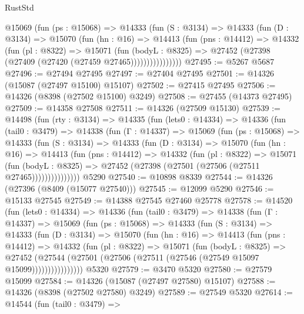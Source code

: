 \begin{lexlean}{RustStd}
\begin{coremodule}
            @15069
              (fun (ps : @15068) =>
              @14333
                (fun (S : @3134) =>
                @14333
                  (fun (D : @3134) =>
                  @15070
                    (fun (hn : @16) =>
                    @14413
                      (fun (pns : @14412) =>
                      @14332
                        (fun (pl : @8322) =>
                        @15071
                          (fun (bodyL : @8325) =>
                          @27452 (@27398 (@27409 (@27420 (@27459 @27465))))))))))))))))
@27495 := @5267 @5687
@27496 := @27494 @27495
@27497 := @27404 @27495
@27501 := @14326 (@15087 (@27497 @15100) @15107)
@27502 := @27415 @27495
@27506 := @14326 (@8398 (@27502 @15100) @3249)
@27508 := @27455 (@14373 @27495)
@27509 := @14358 @27508
@27511 := @14326 (@27509 @15130)
@27539 := @14498
    (fun (rty : @3134) =>
    @14335
      (fun (lets0 : @14334) =>
      @14336
        (fun (tail0 : @3479) =>
        @14338
          (fun (Γ : @14337) =>
          @15069
            (fun (ps : @15068) =>
            @14333
              (fun (S : @3134) =>
              @14333
                (fun (D : @3134) =>
                @15070
                  (fun (hn : @16) =>
                  @14413
                    (fun (pns : @14412) =>
                    @14332
                      (fun (pl : @8322) =>
                      @15071
                        (fun (bodyL : @8325) =>
                        @27452 (@27398 (@27501 (@27506 (@27511 @27465)))))))))))))))
    @5290
@27540 := @10898 @8339
@27544 := @14326 (@27396 (@8409 (@15077 @27540)))
@27545 := @12099 @5290
@27546 := @15133 @27545
@27549 := @14388 @27545 @27460 @25778
@27578 := @14520
    (fun (lets0 : @14334) =>
    @14336
      (fun (tail0 : @3479) =>
      @14338
        (fun (Γ : @14337) =>
        @15069
          (fun (ps : @15068) =>
          @14333
            (fun (S : @3134) =>
            @14333
              (fun (D : @3134) =>
              @15070
                (fun (hn : @16) =>
                @14413
                  (fun (pns : @14412) =>
                  @14332
                    (fun (pl : @8322) =>
                    @15071
                      (fun (bodyL : @8325) =>
                      @27452
                        (@27544
                          (@27501 (@27506 (@27511 (@27546 (@27549 @15097 @15099))))))))))))))))
    @5320
@27579 := @3470 @5320
@27580 := @27579 @15099
@27584 := @14326 (@15087 (@27497 @27580) @15107)
@27588 := @14326 (@8398 (@27502 @27580) @3249)
@27589 := @27549 @5320
@27614 := @14544
    (fun (tail0 : @3479) =>

\end{coremodule}
\end{lexlean}
